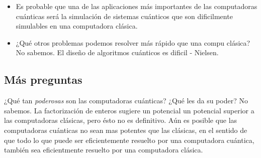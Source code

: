 \documentclass[a4paper]{article}
\begin{document}
\begin{itemize}
    \item Es probable que una de las aplicaciones más
      importantes de las computadoras cuánticas será la
      simulación de sistemas cuánticos que son dificilmente
      simulables en una computadora clásica.

    \item ¿Qué otros problemas podemos resolver más rápido
      que una compu clásica? No sabemos. El diseño de
      algoritmos cuánticos es dificil - Nielsen.




  \end{itemize}
  
  

  \subsection{Más preguntas}

  ¿Qué tan \textit{poderosas} son las computadoras
  cuánticas? ¿Qué les da su poder? No sabemos. La
  factorización de enteros sugiere un potencial un potencial
  superior a las computadoras clásicas, pero ésto no es
  definitivo. Aún es posible que las computadoras cuánticas
  no sean mas potentes que las clásicas, en el sentido de
  que todo lo que puede ser eficientemente resuelto por una
  computadora cuántica, también sea eficientmente resuelto
  por una computadora clásica.
\end{document}
